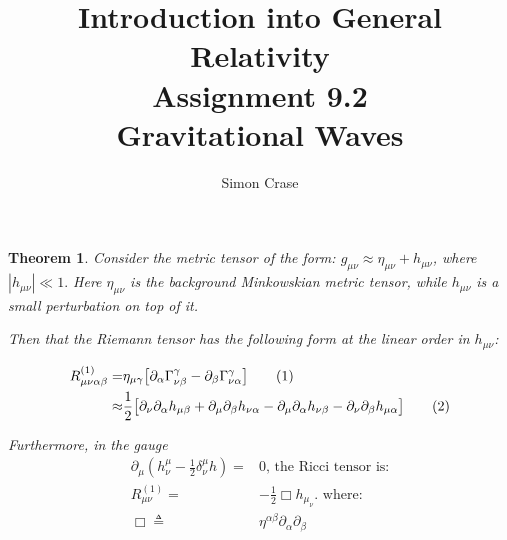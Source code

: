 \documentclass[]{article}
\title{Introduction into General Relativity\\Assignment 9.2\\Gravitational Waves}
\author{Simon Crase}
\newtheorem{theorem}{Theorem}
\newcommand\numberthis{\addtocounter{equation}{1}\tag{\theequation}}
\begin{document}
\maketitle
\thispagestyle{fancy}
\raggedright

\begin{theorem}\label{th:thethm}
Consider the metric tensor of the form: $g_{\mu\nu} \approx \eta_{\mu\nu} + h_{\mu\nu}$, where $|h_{\mu\nu}| \ll 1.$ Here $\eta_{\mu\nu}$ is the background Minkowskian metric tensor, while $h_{\mu\nu}$ is a small perturbation on top of it.

Then that the Riemann tensor has the following form at the linear order in $h_{\mu\nu}$:

\begin{align*}
R^{(1)}_{\mu\nu\alpha\beta} =& \eta_{\mu\gamma}\big[\partial_{\alpha}\Gamma^{\gamma}_{\nu\beta} - \partial_{\beta}\Gamma^{\gamma}_{\nu\alpha}\big]\numberthis\label{eq:R1}\\
\approx& \frac{1}{2}\big[\partial_{\nu}\partial_{\alpha}h_{\mu\beta} + \partial_{\mu}\partial_{\beta}h_{\nu\alpha} - \partial_{\mu}\partial_{\alpha}h_{\nu\beta} - \partial_{\nu}\partial_{\beta}h_{\mu\alpha}\big]\numberthis\label{eq:R2}
\end{align*}

Furthermore, in the gauge 
\begin{align*}
\partial_{\mu}(h^{\mu}_{\nu}-\frac{1}{2}\delta^{\mu}_{\nu}h)=&0\text{, the Ricci tensor is:}\\
R^{(1)}_{\mu\nu} =& - \frac{1}{2} \Box h_{\mu_{\nu}} \text{. where:}\\
\Box \triangleq & \eta^{\alpha\beta}\partial_{\alpha}\partial_{\beta}
\end{align*}
 
\end{theorem}
\end{document}
